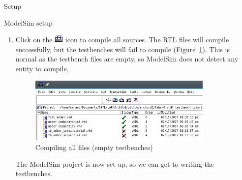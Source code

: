 \documentclass[a4paper, 12pt, onecolumn]{article}
\begin{document}
\begin{section}{Setup}
\begin{subsection}{ModelSim setup}
\begin{enumerate}
\begin{figure}[!h]
\begin{subfigure}[t]{0.40\textwidth}
                    \end{subfigure}
                    \caption{ModelSim project creation}
                \end{figure}

            \item Click on the \includegraphics[height=12pt]{figs/compile_all_icon.png} icon to compile all sources. The RTL files will compile successfully, but the testbenches will fail to compile (Figure~\ref{fig:compiling_with_empty_testbenches}). This is normal as the testbench files are empty, so ModelSim does not detect any entity to compile.

                \begin{figure}[!h]
                    \begin{centering}
                        \includegraphics[width=0.85\textwidth]{figs/compiling_with_empty_testbenches.png}
                        \caption{Compiling all files (empty testbenches)}
                        \label{fig:compiling_with_empty_testbenches}
                    \end{centering}
                \end{figure}

                The ModelSim project is now set up, so we can get to writing the testbenches.
        \end{enumerate}
    \end{subsection}
\end{section}

\clearpage
\end{document}
